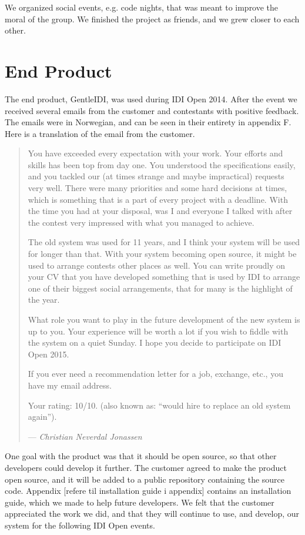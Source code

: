 We organized social events, e.g. code nights, that was meant to improve
the moral of the group. We finished the project as friends, and we grew
closer to each other.



\section{End Product}

The end product, GentleIDI, was used during IDI Open 2014. After the
event we received several emails from the customer and contestants with
positive feedback. The emails were in Norwegian, and can be seen in
their entirety in appendix F. Here is a translation of the email from
the customer.

\begin{quotation}
You have exceeded every expectation with your work.
Your efforts and skills has been top from day one. You understood the
specifications easily, and you tackled our (at times strange and maybe
impractical) requests very well. There were many priorities and some
hard decisions at times, which is something that is a part of every
project with a deadline. With the time you had at your disposal, was I
and everyone I talked with after the contest very impressed with what
you managed to achieve.

The old system was used for 11 years, and I think your system will be
used for longer than that. With your system becoming open source, it
might be used to arrange contests other places as well. You can write
proudly on your CV that you have developed something that is used by
IDI to arrange one of their biggest social arrangements, that for many
is the highlight of the year.

What role you want to play in the future development of the new system
is up to you. Your experience will be worth a lot if you wish to fiddle
with the system on a quiet Sunday. I hope you decide to participate on
IDI Open 2015.

If you ever need a recommendation letter for a job, exchange, etc., you
have my email address.

Your rating: 10/10. (also known as: ``would hire to
replace an old system again'').

\hfill--- \textit{Christian Neverdal Jonassen}
\end{quotation}

One goal with the product was that it should be open source, so that
other developers could develop it further. The customer agreed to make
the product open source, and it will be added to a public repository
containing the source code. Appendix [refere til installation guide i
appendix] contains an installation guide, which we made to help future
developers. We felt that the customer appreciated the work we did, and
that they will continue to use, and develop, our system for the
following IDI Open events.

